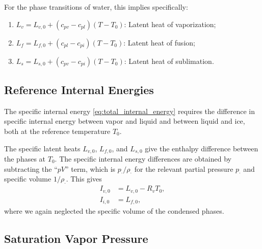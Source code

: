 \documentclass{article}
\begin{document}
For the phase transitions of water, this implies specifically:
\begin{enumerate}
    \item $L_v = L_{v,0} + (c_{pv} - c_{pl}) (T - T_0)$: Latent heat of vaporization;
    \item $L_f = L_{f,0} + (c_{pl} - c_{pi}) (T - T_0)$: Latent heat of fusion;
    \item $L_s = L_{s,0} + (c_{pv} - c_{pi}) (T - T_0)$: Latent heat of sublimation.
\end{enumerate}

\subsection{Reference Internal Energies}

The specific internal energy \eqref{eq:total_internal_energy} requires the difference in specific internal energy between vapor and liquid and between liquid and ice, both at the reference temperature $T_0$. 

The specific latent heats $L_{v,0}$, $L_{f,0}$, and $L_{s,0}$ give the enthalpy difference between the phases at $T_0$. The specific internal energy differences are obtained by subtracting the ``$pV$'' term, which is $p_\cdot/\rho_\cdot$ for the relevant partial pressure $p_\cdot$ and specific volume $1/\rho_\cdot$. This gives
\begin{align}
     I_{v,0} &= L_{v, 0} - R_v T_0,\\
     I_{i,0} &= L_{f, 0},
\end{align}
where we again neglected the specific volume of the condensed phases. 
   
\subsection{Saturation Vapor Pressure}
\end{document}

